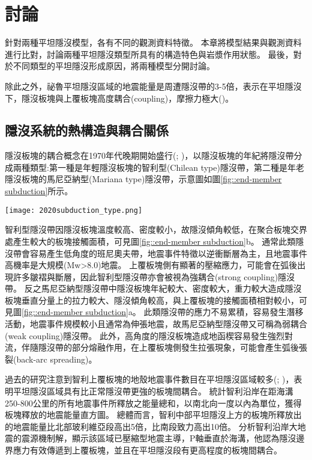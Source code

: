 
\chapter{討論}

針對兩種平坦隱沒模型，各有不同的觀測資料特徵。
本章將模型結果與觀測資料進行比對，討論兩種平坦隱沒類型所具有的構造特色與岩漿作用狀態。
最後，對於不同類型的平坦隱沒形成原因，將兩種模型分開討論。


除此之外，祕魯平坦隱沒區域的地震能量是周遭隱沒帶的3-5倍，表示在平坦隱沒下，隱沒板塊與上覆板塊高度耦合(coupling)，摩擦力極大(\citealp{Gutscher2000A})。


\section{隱沒系統的熱構造與耦合關係}
隱沒板塊的耦合概念在1970年代晚期開始盛行(\citealp{uyeda1979back}; \citealp{ruff1980seismicity})，\citealp{uyeda1979back}以隱沒板塊的年紀將隱沒帶分成兩種類型:第一種是年輕隱沒板塊的智利型(Chilean type)隱沒帶，第二種是年老隱沒板塊的馬尼亞納型(Mariana type)隱沒帶，示意圖如圖\ref{fig::end-member subduction}所示。
\begin{figure*}[htp]
    \centering
    \texttt{[image: 2020subduction\_type.png]}
    \caption[隱沒帶的兩種型態示意圖]{隱沒帶的兩種型態示意圖，摘自\citealp{Yan2020}。}
    \label{fig::end-member subduction}
\end{figure*}

智利型隱沒帶因隱沒板塊溫度較高、密度較小，故隱沒傾角較低，在聚合板塊交界處產生較大的板塊接觸面積，可見圖\ref{fig::end-member subduction}b。
通常此類隱沒帶會容易產生低角度的班尼奧夫帶，地震事件特徵以逆衝斷層為主，且地震事件高機率是大規模(Mw>8.0)地震。
上覆板塊側有顯著的壓縮應力，可能會在弧後出現許多皺褶與斷層，因此智利型隱沒帶亦會被視為強耦合(strong coupling)隱沒帶。
反之馬尼亞納型隱沒帶中隱沒板塊年紀較大、密度較大，重力較大造成隱沒板塊垂直分量上的拉力較大、隱沒傾角較高，與上覆板塊的接觸面積相對較小，可見圖\ref{fig::end-member subduction}a。
此類隱沒帶的應力不易累積，容易發生潛移活動，地震事件規模較小且通常為伸張地震，故馬尼亞納型隱沒帶又可稱為弱耦合(weak coupling)隱沒帶。
此外，高角度的隱沒板塊造成地函楔容易發生強烈對流，伴隨隱沒帶的部分熔融作用，在上覆板塊側發生拉張現象，可能會產生弧後張裂(back-arc spreading)。

過去的研究注意到智利上覆板塊的地殼地震事件數目在平坦隱沒區域較多(\citealp{jordan1983andean}; \citealp{smalley1993basement})，表明平坦隱沒區域具有比正常隱沒帶更強的板塊間耦合。
\citealp{gutscher2002andean}統計智利沿岸在距海溝250-800公里的所有地震事件所釋放之能量總和，以南北向一度以內為單位，獲得板塊釋放的地震能量直方圖。
總體而言，智利中部平坦隱沒上方的板塊所釋放出的地震能量比北部玻利維亞段高出5倍，比南段致力高出10倍。
\citealp{jordan1983andean}分析智利沿岸大地震的震源機制解，顯示該區域已壓縮型地震主導，P軸垂直於海溝，他認為隱沒邊界應力有效傳遞到上覆板塊，並且在平坦隱沒段有更高程度的板塊間耦合。

